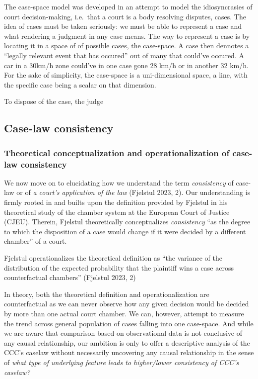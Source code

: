 \documentclass[
  11pt,
]{article}
\begin{document}
The case-space model was developed in an attempt to model the
idiosyncrasies of court decision-making, i.e.~that a court is a body
resolving disputes, cases. The idea of cases must be taken seriously: we
must be able to represent a case and what rendering a judgment in any
case means. The way to represent a case is by locating it in a space of
of possible cases, the case-space. A case then dennotes a ``legally
relevant event that has occured'' out of many that could've occured. A
car in a 30km/h zone could've in one case gone 28 km/h or in another 32
km/h. For the sake of simplicity, the case-space is a uni-dimensional
space, a line, with the specific case being a scalar on that dimension.

To dispose of the case, the judge

\subsection{Case-law consistency}\label{case-law-consistency}

\subsubsection{Theoretical conceptualization and operationalization of
case-law
consistency}\label{theoretical-conceptualization-and-operationalization-of-case-law-consistency}

We now move on to elucidating how we understand the term
\emph{consistency} of case-law or of \emph{a court's application of the
law} (Fjelstul 2023, 2). Our understanding is firmly rooted in and
builts upon the definition provided by Fjelstul in his theoretical study
of the chamber system at the European Court of Justice (CJEU). Therein,
Fjelstul theoretically conceptualizes \emph{consistency} ``as the degree
to which the disposition of a case would change if it were decided by a
different chamber'' of a court.

Fjelstul operationalizes the theoretical definition as ``the variance of
the distribution of the expected probability that the plaintiff wins a
case across counterfactual chambers'' (Fjelstul 2023, 2)

In theory, both the theoretical definition and operationalization are
counterfactual as we can never observe how any given decision would be
decided by more than one actual court chamber. We can, however, attempt
to measure the trend across general population of cases falling into one
case-space. And while we are aware that comparison based on
observational data is not conclusive of any causal relationship, our
ambition is only to offer a descriptive analysis of the CCC's caselaw
without necessarily uncovering any causal relationship in the sense of
\emph{what type of underlying feature leads to higher/lower consistency
of CCC's caselaw?}
\end{document}
